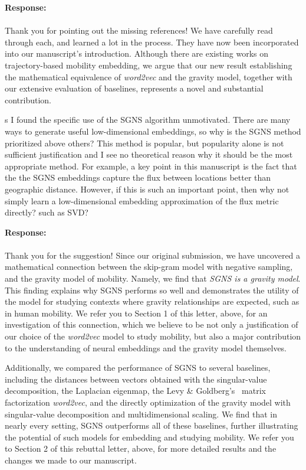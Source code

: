 \documentclass[12pt,a4paper]{article}
\newcounter{comment}[subsection]
\newcommand{\response}[1]{{\noindent \textbf{Response:} \\ \\ \noindent #1}}
\newcommand{\rcomment}[1]{%
\vspace{10pt}
\begin{sectionbox}
s #1
\end{sectionbox}
}
\begin{document}
\response{Thank you for pointing out the missing references!
	We have carefully read through each, and learned a lot in the process.
	They have now been incorporated into our manuscript's introduction.
	Although there are existing works on trajectory-based mobility embedding, we argue that our new result establishing the mathematical equivalence of \textit{word2vec} and the gravity model, together with our extensive evaluation of baselines, represents a novel and substantial contribution.
}

\rcomment{
	I found the specific use of the SGNS algorithm unmotivated. There are many ways to generate useful low-dimensional embeddings, so why is the SGNS method prioritized above others? This method is popular, but popularity alone is not sufficient justification and I see no theoretical reason why it should be the most appropriate method. For example, a key point in this manuscript is the fact that the the SGNS embeddings capture the flux between locations better than geographic distance. However, if this is such an important point, then why not simply learn a low-dimensional embedding approximation of the flux metric directly? such as SVD?
}

\response{
	Thank you for the suggestion!
	Since our original submission, we have uncovered a mathematical connection between the skip-gram model with negative sampling, and the gravity model of mobility.
	Namely, we find that \emph{SGNS is a gravity model}.
	This finding explains why SGNS performs so well and demonstrates the utility of the model for studying contexts where gravity relationships are expected, such as in human mobility.
	We refer you to Section 1 of this letter, above, for an investigation of this connection, which we believe to be not only a justification of our choice of the \textit{word2vec} model to study mobility, but also a major contribution to the understanding of neural embeddings and the gravity model themselves.

	Additionally, we compared the performance of SGNS to several baselines, including the distances between vectors obtained with the singular-value decomposition, the Laplacian eigenmap, the Levy
	\& Goldberg's~\autocite{levy2014neural} matrix factorization \textit{word2vec}, and the directly optimization of the gravity model with singular-value decomposition and multidimensional scaling.
	We find that in nearly every setting, SGNS outperforms all of these baselines, further illustrating the potential of such models for embedding and studying mobility.
	We refer you to Section 2 of this rebuttal letter, above, for more detailed results and the changes we made to our manuscript.
}
\end{document}
